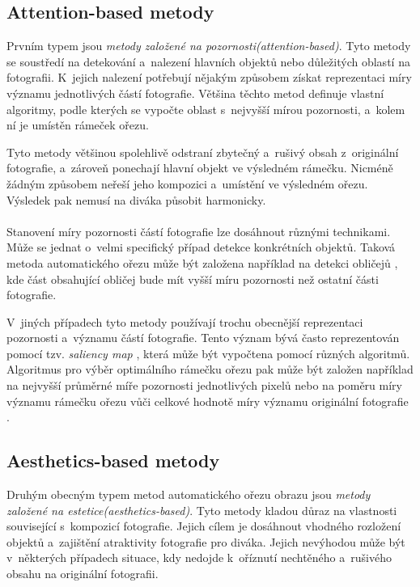 \subsection{Attention-based metody} \label{section:attention-metody}
Prvním typem jsou \emph{metody založené na pozornosti(attention-based)}. Tyto metody se soustředí na detekování a~nalezení hlavních objektů nebo důležitých oblastí na fotografii. K~jejich nalezení potřebují nějakým způsobem získat reprezentaci míry významu jednotlivých částí fotografie. Většina těchto metod definuje vlastní algoritmy, podle kterých se vypočte oblast s~nejvyšší mírou pozornosti, a~kolem ní je umístěn rámeček ořezu.

Tyto metody většinou spolehlivě odstraní zbytečný a~rušivý obsah z~originální fotografie, a~zároveň ponechají hlavní objekt ve výsledném rámečku. Nicméně žádným způsobem neřeší jeho kompozici a~umístění ve výsledném ořezu. Výsledek pak nemusí na diváka působit harmonicky.

\paragraph{}
Stanovení míry pozornosti částí fotografie lze dosáhnout různými technikami. Může se jednat o~velmi specifický případ detekce konkrétních objektů. Taková metoda automatického ořezu může být založena například na detekci obličejů \cite{Zhang2005}, kde část obsahující obličej bude mít vyšší míru pozornosti než ostatní části fotografie.

V~jiných případech tyto metody používají trochu obecnější reprezentaci pozornosti a~významu částí fotografie. Tento význam bývá často reprezentován pomocí tzv. \emph{saliency map} \cite{Achanta2009,Itti1998,Margolin2013,Stentiford2007}, která může být vypočtena pomocí různých algoritmů. Algoritmus pro výběr optimálního rámečku ořezu pak může být založen například na nejvyšší průměrné míře pozornosti jednotlivých pixelů \cite{Stentiford2007} nebo na poměru míry významu rámečku ořezu vůči celkové hodnotě míry významu originální fotografie \cite{Suh2003}.


\subsection{Aesthetics-based metody} \label{section:aesthetics-metody}
Druhým obecným typem metod automatického ořezu obrazu jsou \emph{metody založené na estetice(aesthetics-based)}. Tyto metody kladou důraz na vlastnosti související s~kompozicí fotografie. Jejich cílem je dosáhnout vhodného rozložení objektů a~zajištění atraktivity fotografie pro diváka. Jejich nevýhodou může být v~některých případech situace, kdy nedojde k~oříznutí nechtěného a~rušivého obsahu na originální fotografii.

